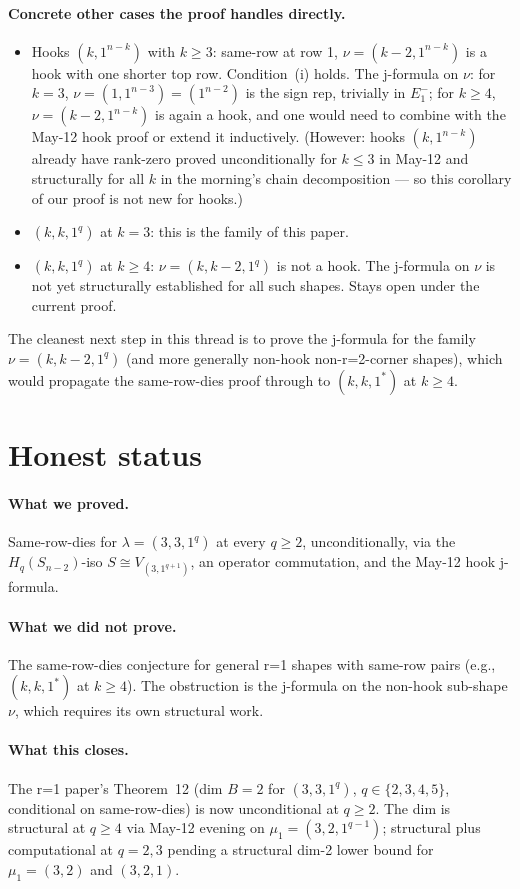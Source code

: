 \documentclass[11pt]{article}
\theoremstyle{definition}
\begin{document}
\paragraph{Concrete other cases the proof handles directly.}
\begin{itemize}[leftmargin=2em,topsep=0.2em,itemsep=0.1em]
\item Hooks $(k, 1^{n-k})$ with $k \ge 3$: same-row at row 1,
$\nu = (k-2, 1^{n-k})$ is a hook with one shorter top row.
Condition~(i) holds. The j-formula on $\nu$: for $k = 3$,
$\nu = (1, 1^{n-3}) = (1^{n-2})$ is the sign rep, trivially
in $E_1^-$; for $k \ge 4$, $\nu = (k-2, 1^{n-k})$ is again a hook,
and one would need to combine with the May-12 hook proof or extend
it inductively. (However: hooks $(k, 1^{n-k})$ already have rank-zero
proved unconditionally for $k \le 3$ in May-12 and structurally for
all $k$ in the morning's chain decomposition --- so this corollary
of our proof is not new for hooks.)
\item $(k, k, 1^q)$ at $k = 3$: this is the family of this paper.
\item $(k, k, 1^q)$ at $k \ge 4$: $\nu = (k, k-2, 1^q)$ is not a
hook. The j-formula on $\nu$ is not yet structurally established for
all such shapes. Stays open under the current proof.
\end{itemize}

The cleanest next step in this thread is to prove the j-formula for
the family $\nu = (k, k-2, 1^q)$ (and more generally non-hook
non-r=2-corner shapes), which would propagate the same-row-dies
proof through to $(k, k, 1^*)$ at $k \ge 4$.

\section{Honest status}\label{sec:honest}

\paragraph{What we proved.} Same-row-dies for
$\lambda = (3, 3, 1^q)$ at every $q \ge 2$, unconditionally, via the
$H_q(S_{n-2})$-iso $S \cong V_{(3, 1^{q+1})}$, an operator commutation,
and the May-12 hook j-formula.

\paragraph{What we did not prove.} The same-row-dies conjecture for
general r=1 shapes with same-row pairs (e.g., $(k, k, 1^*)$ at
$k \ge 4$). The obstruction is the j-formula on the non-hook
sub-shape $\nu$, which requires its own structural work.

\paragraph{What this closes.} The r=1 paper's Theorem~12 (dim $B = 2$
for $(3, 3, 1^q)$, $q \in \{2, 3, 4, 5\}$, conditional on same-row-dies)
is now unconditional at $q \ge 2$. The dim is structural at $q \ge 4$
via May-12 evening on $\mu_1 = (3, 2, 1^{q-1})$; structural plus
computational at $q = 2, 3$ pending a structural dim-2 lower bound
for $\mu_1 = (3, 2)$ and $(3, 2, 1)$.
\end{document}
